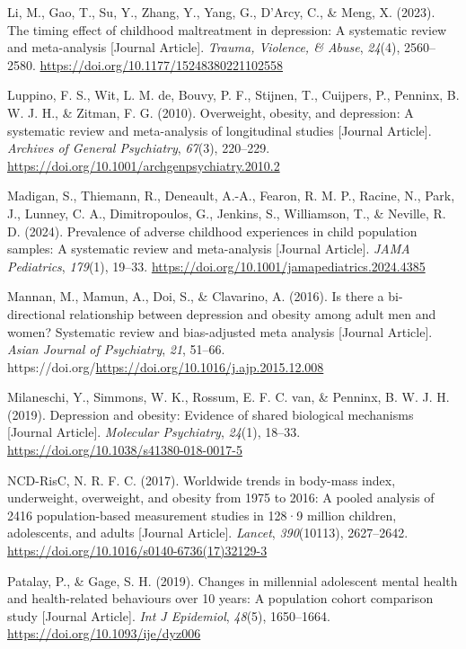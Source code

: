 \documentclass[
  letterpaper,
  DIV=11,
  numbers=noendperiod]{scrreport}
\newlength{\cslhangindent}
\newenvironment{CSLReferences}[2] %
 {\begin{list}{}{%
  \setlength{\itemindent}{0pt}
  \setlength{\leftmargin}{0pt}
  \setlength{\parsep}{0pt}
  \ifodd #1
   \setlength{\leftmargin}{\cslhangindent}
   \setlength{\itemindent}{-1\cslhangindent}
  \fi
  \setlength{\itemsep}{#2\baselineskip}}}
 {\end{list}}
\begin{document}
\begin{CSLReferences}{1}{0}
Li, M., Gao, T., Su, Y., Zhang, Y., Yang, G., D'Arcy, C., \& Meng, X.
(2023). The timing effect of childhood maltreatment in depression: A
systematic review and meta-analysis {[}Journal Article{]}. \emph{Trauma,
Violence, \& Abuse}, \emph{24}(4), 2560--2580.
\url{https://doi.org/10.1177/15248380221102558}

Luppino, F. S., Wit, L. M. de, Bouvy, P. F., Stijnen, T., Cuijpers, P.,
Penninx, B. W. J. H., \& Zitman, F. G. (2010). Overweight, obesity, and
depression: A systematic review and meta-analysis of longitudinal
studies {[}Journal Article{]}. \emph{Archives of General Psychiatry},
\emph{67}(3), 220--229.
\url{https://doi.org/10.1001/archgenpsychiatry.2010.2}

Madigan, S., Thiemann, R., Deneault, A.-A., Fearon, R. M. P., Racine,
N., Park, J., Lunney, C. A., Dimitropoulos, G., Jenkins, S., Williamson,
T., \& Neville, R. D. (2024). Prevalence of adverse childhood
experiences in child population samples: A systematic review and
meta-analysis {[}Journal Article{]}. \emph{JAMA Pediatrics},
\emph{179}(1), 19--33.
\url{https://doi.org/10.1001/jamapediatrics.2024.4385}

Mannan, M., Mamun, A., Doi, S., \& Clavarino, A. (2016). Is there a
bi-directional relationship between depression and obesity among adult
men and women? Systematic review and bias-adjusted meta analysis
{[}Journal Article{]}. \emph{Asian Journal of Psychiatry}, \emph{21},
51--66. https://doi.org/\url{https://doi.org/10.1016/j.ajp.2015.12.008}

Milaneschi, Y., Simmons, W. K., Rossum, E. F. C. van, \& Penninx, B. W.
J. H. (2019). Depression and obesity: Evidence of shared biological
mechanisms {[}Journal Article{]}. \emph{Molecular Psychiatry},
\emph{24}(1), 18--33. \url{https://doi.org/10.1038/s41380-018-0017-5}

NCD-RisC, N. R. F. C. (2017). Worldwide trends in body-mass index,
underweight, overweight, and obesity from 1975 to 2016: A pooled
analysis of 2416 population-based measurement studies in 128·9 million
children, adolescents, and adults {[}Journal Article{]}. \emph{Lancet},
\emph{390}(10113), 2627--2642.
\url{https://doi.org/10.1016/s0140-6736(17)32129-3}

Patalay, P., \& Gage, S. H. (2019). Changes in millennial adolescent
mental health and health-related behaviours over 10 years: A population
cohort comparison study {[}Journal Article{]}. \emph{Int J Epidemiol},
\emph{48}(5), 1650--1664. \url{https://doi.org/10.1093/ije/dyz006}


\end{CSLReferences}
\end{document}
